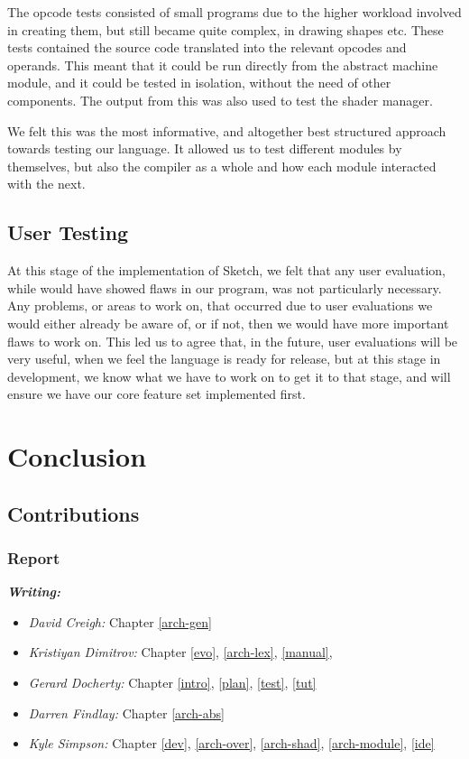 \documentclass{l3proj}
\begin{document}
The opcode tests consisted of small programs due to the higher workload involved in creating them, but still became quite complex, in drawing shapes etc. These tests contained the source code translated into the relevant opcodes and operands. This meant that it could be run directly from the abstract machine module, and it could be tested in isolation, without the need of other components. The output from this was also used to test the shader manager.

We felt this was the most informative, and altogether best structured approach towards testing our language. It allowed us to test different modules by themselves, but also the compiler as a whole and how each module interacted with the next.

\section{User Testing}
At this stage of the implementation of Sketch, we felt that any user evaluation, while would have showed flaws in our program, was not particularly necessary. Any problems, or areas to work on, that occurred due to user evaluations we would either already be aware of, or if not, then we would have more important flaws to work on. This led us to agree that, in the future, user evaluations will be very useful, when we feel the language is ready for release, but at this stage in development, we know what we have to work on to get it to that stage, and will ensure we have our core feature set implemented first.
\chapter{Conclusion}
\label{conc}

\section{Contributions}
\label{cont}

\subsection{Report}
\label{cont-report}

\textit{\textbf{Writing:}}
\begin{itemize}
\item \emph{David Creigh:} Chapter \ref{arch-gen}
\item \emph{Kristiyan Dimitrov:} Chapter \ref{evo}, \ref{arch-lex}, \ref{manual}, 
\item \emph{Gerard Docherty:} Chapter \ref{intro}, \ref{plan}, \ref{test}, \ref{tut}
\item \emph{Darren Findlay:} Chapter \ref{arch-abs}
\item \emph{Kyle Simpson:} Chapter \ref{dev}, \ref{arch-over}, \ref{arch-shad}, \ref{arch-module}, \ref{ide}
\end{itemize}
\end{document}
